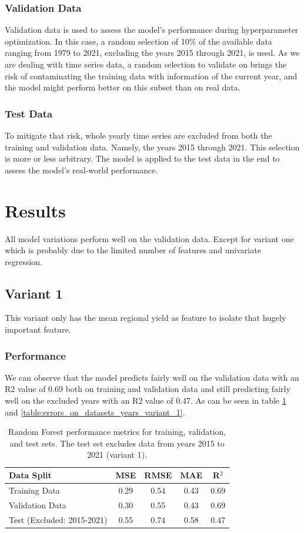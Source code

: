 \documentclass{article}
\begin{document}
\subsubsection{Validation Data}
Validation data is used to assess the model's performance during hyperparameter optimization.
In this case, a random selection of 10\% of the available data ranging from 1979 to 2021, excluding the years 2015 through 2021, is used.
As we are dealing with time series data, a random selection to validate on brings the risk of contaminating the training data with information of the current year, and the model might perform better on this subset than on real data.
\subsubsection{Test Data}
To mitigate that risk, whole yearly time series are excluded from both the training and validation data. Namely, the years 2015 through 2021. This selection is more or less arbitrary.
The model is applied to the test data in the end to assess the model's real-world performance.
\section{Results}
All model variations perform well on the validation data. Except for variant one which is probably due to the limited number of features and univariate regression.
\subsection{Variant 1}
This variant only has the mean regional yield as feature to isolate that hugely important feature.
\subsubsection{Performance}
We can observe that the model predicts fairly well on the validation data with an R2 value of 0.69 both on training and validation data and still predicting fairly well on the excluded years with an R2 value of 0.47.
As can be seen in table \ref{table:errors_on_datasets_variant_1} and \ref{table:errors_on_datasets_years_variant_1}.
\begin{table}[H]
	\centering
	\begin{tabular}{lcccc}
		\hline
		Data Split                 & MSE  & RMSE & MAE  & R$^2$ \\
		\hline
		Training Data              & 0.29 & 0.54 & 0.43 & 0.69  \\
		Validation Data            & 0.30 & 0.55 & 0.43 & 0.69  \\
		Test (Excluded: 2015-2021) & 0.55 & 0.74 & 0.58 & 0.47  \\
		\hline
	\end{tabular}
	\caption{\label{table:errors_on_datasets_variant_1} Random Forest performance metrics for training, validation, and test sets. The test set excludes data from years 2015 to 2021 (variant 1).}
\end{table}
\end{document}
